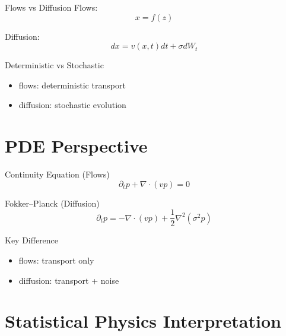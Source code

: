 \documentclass{beamer}
\begin{document}

\begin{frame}{Flows vs Diffusion}
Flows:
\[
x = f(z)
\]

Diffusion:
\[
dx = v(x,t)dt + \sigma dW_t
\]
\end{frame}


\begin{frame}{Deterministic vs Stochastic}
\begin{itemize}
\item flows: deterministic transport
\item diffusion: stochastic evolution
\end{itemize}
\end{frame}

\section{PDE Perspective}

\begin{frame}{Continuity Equation (Flows)}
\[
\partial_t p + \nabla \cdot (v p) = 0
\]
\end{frame}


\begin{frame}{Fokker–Planck (Diffusion)}
\[
\partial_t p = -\nabla \cdot (v p) + \frac{1}{2}\nabla^2 (\sigma^2 p)
\]
\end{frame}


\begin{frame}{Key Difference}
\begin{itemize}
\item flows: transport only
\item diffusion: transport + noise
\end{itemize}
\end{frame}

\section{Statistical Physics Interpretation}
\end{document}
